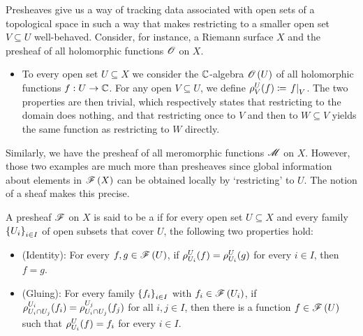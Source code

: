 \documentclass[../Moduli_Spaces_of_Riemann_Surfaces.tex]{subfiles}
\begin{document}
    \begin{remark}
        Presheaves give us a way of tracking data associated with open sets of a topological space in such a way that makes restricting to a smaller open set $V\subseteq U$ well-behaved. Consider, for instance, a Riemann surface $X$ and the presheaf of all holomorphic functions $\mathscr{O}$ on $X$.
        \begin{itemize}
            \item To every open set $U\subseteq X$ we consider the $\mathbb{C}$-algebra $\mathscr{O}\left(U\right)$ of all holomorphic functions $f:U\to\mathbb{C}$. For any open $V\subseteq U$, we define $\rho^U_V\!\left(f\right)\coloneqq\left.f\right|_V$. The two properties are then trivial, which respectively states that restricting to the domain does nothing, and that restricting once to $V$ and then to $W\subseteq V$ yields the same function as restricting to $W$ directly.
        \end{itemize}
        Similarly, we have the presheaf of all meromorphic functions $\mathscr{M}$ on $X$. However, those two examples are much more than presheaves since global information about elements in $\mathscr{F}\left(X\right)$ can be obtained locally by `restricting' to $U$. The notion of a sheaf makes this precise.\exqed
    \end{remark}
    \begin{definition}
        A presheaf $\mathscr{F}$ on $X$ is said to be a  if for every open set $U\subseteq X$ and every family $\left\{U_i\right\}_{i\in I}$ of open subsets that cover $U$, the following two properties hold:
        \begin{itemize}
            \item (Identity): For every $f,g\in\mathscr{F}\left(U\right)$, if $\rho^U_{U_i}\!\left(f\right)=\rho^U_{U_i}\!\left(g\right)$ for every $i\in I$, then $f=g$.
                \vspace{-0.05in}
            \item (Gluing): For every family $\left\{f_i\right\}_{i\in I}$ with $f_i\in\mathscr{F}\left(U_i\right)$, if $\rho^{U_i}_{U_i\cap U_j}\!\left(f_i\right)=\rho^{U_j}_{U_i\cap U_j}\!\left(f_j\right)$ for all $i,j\in I$, then there is a function $f\in\mathscr{F}\left(U\right)$ such that $\rho^U_{U_i}\!\left(f\right)=f_i$ for every $i\in I$.
        \end{itemize}
    \end{definition}
\end{document}
